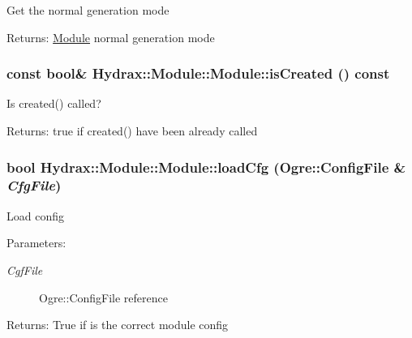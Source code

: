 Get the normal generation mode \begin{Desc}
\item[Returns:]\hyperlink{class_hydrax_1_1_module_1_1_module}{Module} normal generation mode \end{Desc}
\hypertarget{class_hydrax_1_1_module_1_1_module_66097127eb529786f7384b4d39d9e43e}{
\subsubsection[{isCreated}]{\setlength{\rightskip}{0pt plus 5cm}const bool\& Hydrax::Module::Module::isCreated () const}}
\label{class_hydrax_1_1_module_1_1_module_66097127eb529786f7384b4d39d9e43e}


Is created() called? \begin{Desc}
\item[Returns:]true if created() have been already called \end{Desc}
\hypertarget{class_hydrax_1_1_module_1_1_module_bedb96357608c0744bb7816ae1c2b0bb}{
\subsubsection[{loadCfg}]{\setlength{\rightskip}{0pt plus 5cm}bool Hydrax::Module::Module::loadCfg (Ogre::ConfigFile \& {\em CfgFile})}}
\label{class_hydrax_1_1_module_1_1_module_bedb96357608c0744bb7816ae1c2b0bb}


Load config \begin{Desc}
\item[Parameters:]
\begin{description}
\item[{\em CgfFile}]Ogre::ConfigFile reference \end{description}
\end{Desc}
\begin{Desc}
\item[Returns:]True if is the correct module config \end{Desc}



